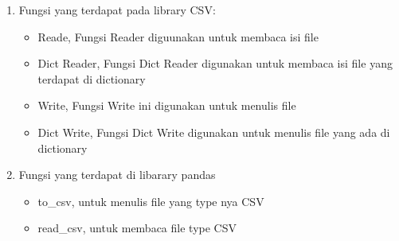 \begin{enumerate}
	\item Fungsi yang terdapat pada library CSV:\\
	\begin{itemize}
	\item Reade, Fungsi Reader diguunakan untuk membaca  isi file
	\end{itemize}
	\begin{itemize}
	\item Dict Reader, Fungsi Dict Reader digunakan untuk membaca isi file yang terdapat di dictionary
	\end{itemize}
	\begin{itemize}
	\item Write, Fungsi Write ini digunakan untuk menulis file
	\end{itemize}
	\begin{itemize}
	\item Dict Write, Fungsi Dict Write digunakan untuk menulis file yang ada di dictionary
	\end{itemize}
	
	\item Fungsi yang terdapat di libarary pandas
	\begin{itemize}
	\item to\_csv, untuk menulis file yang type nya CSV
	\end{itemize}
	\begin{itemize}
	\item read\_csv, untuk membaca file type CSV
	\end{itemize}
	
	
\end{enumerate}


